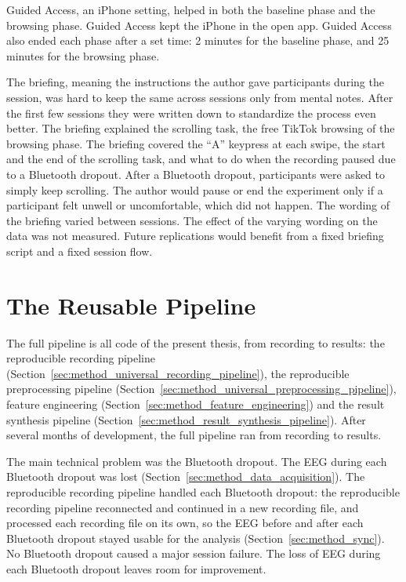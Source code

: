\documentclass[12pt,a4paper]{report}
\begin{document}
Guided Access, an iPhone setting, helped in both the baseline phase and the browsing phase. Guided Access kept the iPhone in the open app. Guided Access also ended each phase after a set time: 2 minutes for the baseline phase, and 25 minutes for the browsing phase.

The briefing, meaning the instructions the author gave participants during the session, was hard to keep the same across sessions only from mental notes. After the first few sessions they were written down to standardize the process even better. The briefing explained the scrolling task, the free TikTok browsing of the browsing phase. The briefing covered the ``A'' keypress at each swipe, the start and the end of the scrolling task, and what to do when the recording paused due to a Bluetooth dropout. After a Bluetooth dropout, participants were asked to simply keep scrolling. The author would pause or end the experiment only if a participant felt unwell or uncomfortable, which did not happen. The wording of the briefing varied between sessions. The effect of the varying wording on the data was not measured. Future replications would benefit from a fixed briefing script and a fixed session flow.

\section{The Reusable Pipeline}
\label{sec:results_pipeline}

The full pipeline is all code of the present thesis, from recording to results: the reproducible recording pipeline (Section~\ref{sec:method_universal_recording_pipeline}), the reproducible preprocessing pipeline (Section~\ref{sec:method_universal_preprocessing_pipeline}), feature engineering (Section~\ref{sec:method_feature_engineering}) and the result synthesis pipeline (Section~\ref{sec:method_result_synthesis_pipeline}). After several months of development, the full pipeline ran from recording to results.

The main technical problem was the Bluetooth dropout. The EEG during each Bluetooth dropout was lost (Section~\ref{sec:method_data_acquisition}). The reproducible recording pipeline handled each Bluetooth dropout: the reproducible recording pipeline reconnected and continued in a new recording file, and processed each recording file on its own, so the EEG before and after each Bluetooth dropout stayed usable for the analysis (Section~\ref{sec:method_sync}). No Bluetooth dropout caused a major session failure. The loss of EEG during each Bluetooth dropout leaves room for improvement.
\end{document}
